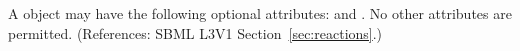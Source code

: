 A \KineticLaw object may have the following optional attributes:
 and .  
No other attributes are permitted.  
(References: SBML L3V1 Section~\ref{sec:reactions}.)
